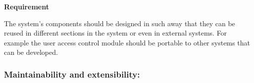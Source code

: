 \begin{flushleft}
\vspace{0.1in}

\textbf{Requirement}

The system's components should be designed in such away that they can be reused in different sections in the system or even in external systems. For example the user access control module should be portable to other systems that can be developed.

\end{flushleft}

\vspace{0.1in}

\vspace{0.2in}
\newpage
\subsubsection{Maintainability and extensibility:}

